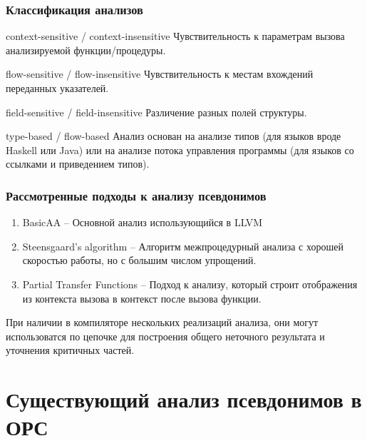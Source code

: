 \documentclass[utf8,russian]{beamer}
\begin{document}
\begin{frame}
\frametitle{Классификация анализов}

\begin{block}{context-sensitive / context-insensitive}
Чувствительность к параметрам вызова анализируемой функции/процедуры.
\end{block}

\begin{block}{flow-sensitive / flow-insensitive}
Чувствительность к местам вхождений переданных указателей.
\end{block}

\begin{block}{field-sensitive / field-insensitive}
Различение разных полей структуры.
\end{block}

\begin{block}{type-based / flow-based}
Анализ основан на анализе типов (для языков вроде Haskell или Java) или на анализе потока управления программы (для языков со ссылками и приведением типов).
\end{block}

\end{frame}


\begin{frame}
\frametitle{Рассмотренные подходы к анализу псевдонимов}

\begin{enumerate}
\item BasicAA -- Основной анализ использующийся в LLVM
\item Steensgaard’s algorithm -- Алгоритм межпроцедурный анализа с хорошей скоростью работы, но с большим числом упрощений.
\item Partial Transfer Functions -- Подход к анализу, который строит отображения из контекста вызова в контекст после вызова функции.
\end{enumerate}

При наличии в компиляторе нескольких реализаций анализа, они могут использоватся по цепочке для построения общего неточного результата и уточнения критичных частей.
\end{frame}

\section{Существующий анализ псевдонимов в ОРС}
\end{document}
